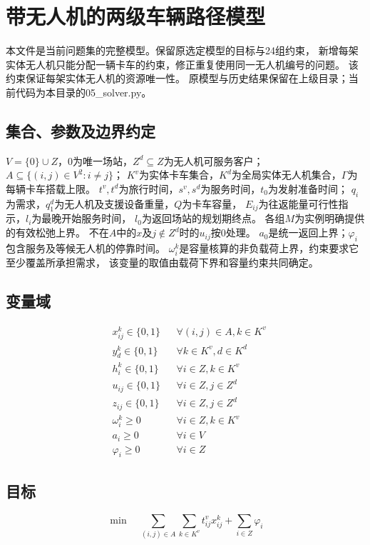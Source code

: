\documentclass[UTF8]{ctexart}
\begin{document}
\section*{带无人机的两级车辆路径模型}
本文件是当前问题集的完整模型。保留原选定模型的目标与24组约束，
新增每架实体无人机只能分配一辆卡车的约束，修正重复使用同一无人机编号的问题。
该约束保证每架实体无人机的资源唯一性。
原模型与历史结果保留在上级目录；当前代码为本目录的05\_solver.py。

\subsection*{集合、参数及边界约定}
$V=\{0\}\cup Z$，0为唯一场站，$Z^d\subseteq Z$为无人机可服务客户；
$A\subseteq\{(i,j)\in V^2:i\ne j\}$；
$K^v$为实体卡车集合，$K^d$为全局实体无人机集合，$\Gamma$为每辆卡车搭载上限。
$t^v,t^d$为旅行时间，$s^v,s^d$为服务时间，$t_0$为发射准备时间；
$q_i$为需求，$q_1^d$为无人机及支援设备重量，$Q$为卡车容量，
$E_{ij}$为往返能量可行性指示，$l_i$为最晚开始服务时间，
$l_0$为返回场站的规划期终点。
各组$M$为实例明确提供的有效松弛上界。
不在$A$中的$x$及$j\notin Z^d$时的$u_{ij}$按0处理。
$a_0$是统一返回上界；$\varphi_i$包含服务及等候无人机的停靠时间。
$\omega_i^k$是容量核算的非负载荷上界，约束要求它至少覆盖所承担需求，
该变量的取值由载荷下界和容量约束共同确定。

\subsection*{变量域}
\[
\begin{aligned}
&x^k_{ij} \in \{0, 1\} && \forall (i,j) \in A, k \in K^v \\
&y^k_d \in \{0, 1\} && \forall k \in K^v, d \in K^d \\
&h^k_i \in \{0, 1\} && \forall i \in Z, k \in K^v \\
&u_{ij} \in \{0, 1\} && \forall i \in Z, j \in Z^d \\
&z_{ij} \in \{0, 1\} && \forall i \in Z, j \in Z^d \\
&\omega^k_i \ge 0 && \forall i \in Z, k \in K^v \\
&a_i \ge 0 && \forall i \in V \\
&\varphi_i \ge 0 && \forall i \in Z
\end{aligned}
\]
\subsection*{目标}
\[
\min\quad\sum_{(i,j)\in A}\sum_{k\in K^v}t^v_{ij}x^k_{ij}
+\sum_{i\in Z}\varphi_i
\]
\end{document}
